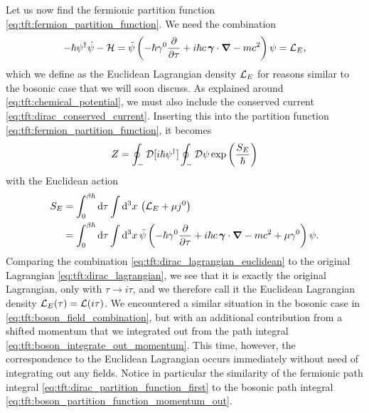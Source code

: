 Let us now find the fermionic partition function \eqref{eq:tft:fermion_partition_function}.
We need the combination
\begin{equation}
	-\hbar \psi^\dagger \dot\psi - \mathcal{H} =
	\bar\psi \left( -\hbar \gamma^0 \pdv{}{\tau} + i \hbar c \, {\bm{\gamma}} \cdot {\bm{\nabla}} - mc^2 \right) \psi =
	\mathcal{L}_E ,
\label{eq:tft:dirac_lagrangian_euclidean}
\end{equation}
which we define as the Euclidean Lagrangian density $\mathcal{L}_E$ for reasons similar to the bosonic case that we will soon discuss.
As explained around \cref{eq:tft:chemical_potential}, we must also include the conserved current \eqref{eq:tft:dirac_conserved_current}.
Inserting this into the partition function \eqref{eq:tft:fermion_partition_function}, it becomes
\begin{equation}
	Z = \oint_- \mathcal{D} [i \hbar \psi^\dagger] \oint_- \mathcal{D} \psi
	    \exp \left( \frac{S_E}{\hbar} \right)
\label{eq:tft:dirac_partition_function_first}
\end{equation}
with the Euclidean action
\begin{equation}
\begin{split}
	S_E &= \int_0^{\beta \hbar} \mathop{}\!\mathrm{d} \tau \int \mathop{}\!\mathrm{d}^3 x \, \left( \mathcal{L}_E + \mu j^0 \right) \\
	    &= \int_0^{\beta \hbar} \mathop{}\!\mathrm{d} \tau \int \mathop{}\!\mathrm{d}^3 x \, \bar\psi \left( -\hbar \gamma^0 \pdv{}{\tau} + i \hbar c \, {\bm{\gamma}} \cdot {\bm{\nabla}} - mc^2 + \mu \gamma^0 \right) \psi .
\end{split}
\label{eq:tft:dirac_action_euclidean}
\end{equation}
Comparing the combination \eqref{eq:tft:dirac_lagrangian_euclidean} to the original Lagrangian \eqref{eq:tft:dirac_lagrangian}, we see that it is exactly the original Lagrangian, only with $\tau \rightarrow i \tau$, and we therefore call it the Euclidean Lagrangian density $\mathcal{L}_E(\tau) = \mathcal{L}(i \tau)$.
We encountered a similar situation in the bosonic case in \cref{eq:tft:boson_field_combination}, but with an additional contribution from a shifted momentum that we integrated out from the path integral \eqref{eq:tft:boson_integrate_out_momentum}.
This time, however, the correspondence to the Euclidean Lagrangian occurs immediately without need of integrating out any fields.
Notice in particular the similarity of the fermionic path integral \eqref{eq:tft:dirac_partition_function_first} to the bosonic path integral \eqref{eq:tft:boson_partition_function_momentum_out}.

